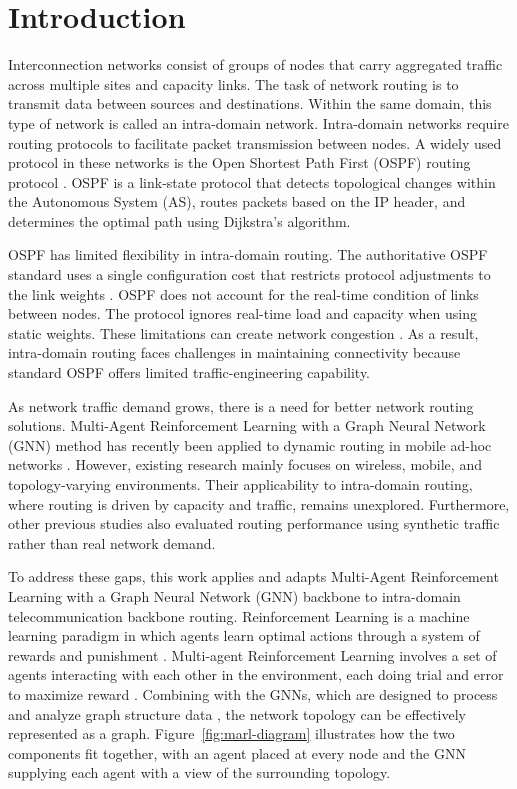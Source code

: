 \section{Introduction} 
Interconnection networks consist of groups of nodes that carry aggregated traffic across multiple sites and capacity links. The task of network routing is to transmit data between sources and destinations. Within the same domain, this type of network is called an intra-domain network. Intra-domain networks require routing protocols to facilitate packet transmission between nodes. A widely used protocol in these networks is the Open Shortest Path First (OSPF) routing protocol \citep{rfc2328}. OSPF is a link-state protocol that detects topological changes within the Autonomous System (AS), routes packets based on the IP header, and determines the optimal path using Dijkstra’s algorithm.

OSPF has limited flexibility in intra-domain routing. The authoritative OSPF standard uses a single configuration cost that restricts protocol adjustments to the link weights \citep{rfc2328}. OSPF does not account for the real-time condition of links between nodes. The protocol ignores real-time load and capacity when using static weights. These limitations can create network congestion \citep{1039866}. As a result, intra-domain routing faces challenges in maintaining connectivity because standard OSPF offers limited traffic-engineering capability.

As network traffic demand grows, there is a need for better network routing solutions. Multi-Agent Reinforcement Learning with a Graph Neural Network (GNN) method has recently been applied to dynamic routing in mobile ad-hoc networks  \citep{11134361}. However, existing research mainly focuses on wireless, mobile, and topology-varying environments. Their applicability to intra-domain routing, where routing is driven by capacity and traffic, remains unexplored. Furthermore, other previous studies also evaluated routing performance using synthetic traffic rather than real network demand.

To address these gaps, this work applies and adapts Multi-Agent Reinforcement Learning with a Graph Neural Network (GNN) backbone to intra-domain telecommunication backbone routing. Reinforcement Learning is a machine learning paradigm in which agents learn optimal actions through a system of rewards and punishment \citep{SHAKARAMI2020107496}. Multi-agent Reinforcement Learning involves a set of agents interacting with each other in the environment, each doing trial and error to maximize reward \citep{marl-book}. Combining with the GNNs, which are designed to process and analyze graph structure data \citep{10960451}, the network topology can be effectively represented as a graph. Figure~\ref{fig:marl-diagram} illustrates how the two components fit together, with an agent placed at every node and the GNN supplying each agent with a view of the surrounding topology.

